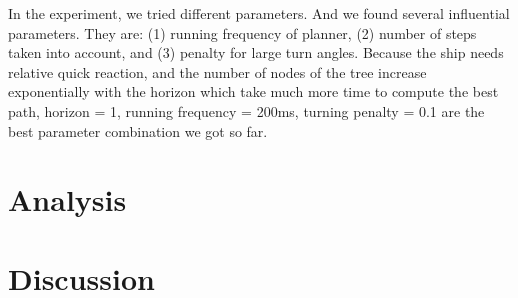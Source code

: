 \documentclass[10pt,final,conference]{article}
\begin{document}
In the experiment, we tried different parameters. And we found several influential parameters. They are: (1) running frequency of planner, (2) number of steps taken into account, and (3) penalty for large turn angles. Because the ship needs relative quick reaction, and the number of nodes of the tree increase exponentially with the horizon which take much more time to compute the best path, horizon = 1, running frequency = 200ms, turning penalty = 0.1 are the best parameter combination we got so far. 


\section{Analysis}


\section{Discussion}




\end{document}
